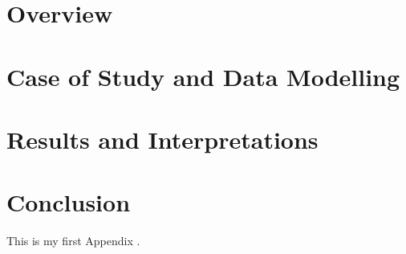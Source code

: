 \documentclass[fontsize=12pt,paper=a4,pagesize=auto]{report}
\begin{document}
\chapter{Overview}
 \label{chap:Overview}
 

\chapter{Case of Study and Data Modelling }
 \label{chap:case}


\chapter{Results and Interpretations }
 \label{chap:res}


\chapter{Conclusion}
\label{chap:conclusion}


\appendix

This is my first Appendix .


       
\end{document}
